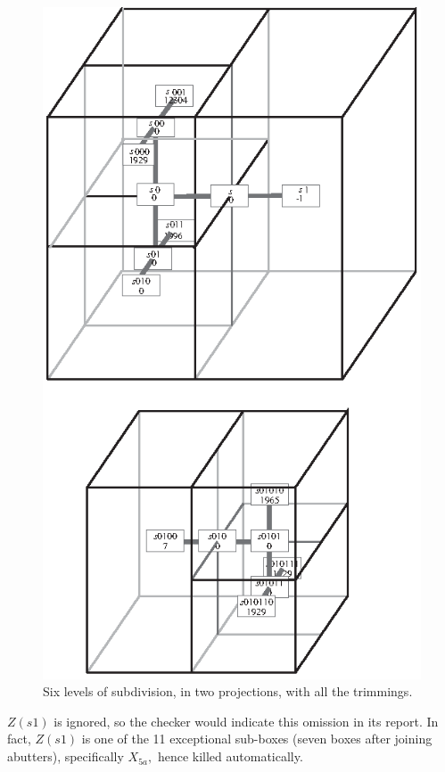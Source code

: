 \begin{example}
 
\begin{figure}[h]\label{GMT fig5.1}
	\centering
	\includegraphics[scale=1.250]{fig5.1}

	\caption{
		Six levels of subdivision, in two projections,
		with all the trimmings.
	}
\end{figure}

$Z(s1)$ is ignored, so the checker would indicate this omission
in its report.  In fact, $Z(s1)$ is one of the 11 exceptional sub-boxes (seven boxes after joining abutters), specifically
$X_{5a},$ hence killed automatically.


\end{example}
